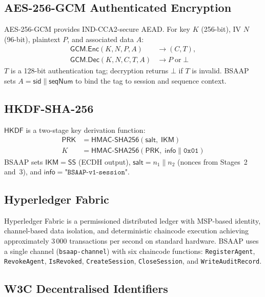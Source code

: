 \documentclass[review,5p,twocolumn,times]{elsarticle}
\begin{document}
\subsection{AES-256-GCM Authenticated Encryption}

AES-256-GCM \cite{nistsp800-38d} provides IND-CCA2-secure AEAD.
For key $K$ (256-bit), IV $N$ (96-bit), plaintext $P$, and associated
data $A$:
\begin{align}
\mathsf{GCM.Enc}(K,N,P,A) &\to (C, T), \nonumber\\
\mathsf{GCM.Dec}(K,N,C,T,A) &\to P \;\text{or}\; \bot
\label{eq:gcm}
\end{align}
$T$ is a 128-bit authentication tag; decryption returns $\bot$ if $T$ is
invalid. BSAAP sets $A = \mathsf{sid} \| \mathsf{seqNum}$ to bind the tag to
session and sequence context.

\subsection{HKDF-SHA-256}

$\mathsf{HKDF}$ \cite{rfc5869} is a two-stage key derivation function:
\begin{align}
\mathsf{PRK} &= \mathsf{HMAC\text{-}SHA256}(\mathsf{salt},\; \mathsf{IKM})
\label{eq:hkdf1}\\
K &= \mathsf{HMAC\text{-}SHA256}(\mathsf{PRK},\; \mathsf{info} \| \mathtt{0x01})
\label{eq:hkdf2}
\end{align}
BSAAP sets $\mathsf{IKM} = \mathsf{SS}$ (ECDH output),
$\mathsf{salt} = n_1 \| n_2$ (nonces from Stages~2 and~3), and
$\mathsf{info} = \texttt{"BSAAP-v1-session"}$.

\subsection{Hyperledger Fabric}

Hyperledger Fabric \cite{androulaki2018hyperledger} is a permissioned
distributed ledger with MSP-based identity, channel-based data isolation,
and deterministic chaincode execution achieving approximately 3\,000
transactions per second on standard hardware.
BSAAP uses a single channel (\texttt{bsaap-channel}) with six chaincode
functions: \texttt{RegisterAgent}, \texttt{RevokeAgent}, \texttt{IsRevoked},
\texttt{CreateSession}, \texttt{CloseSession}, and \texttt{WriteAuditRecord}.

\subsection{W3C Decentralised Identifiers}
\end{document}
